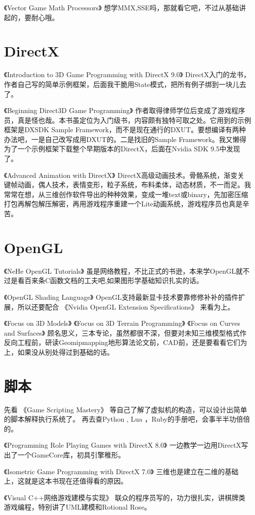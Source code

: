 \documentclass[UTF8,a4paper,8pt]{ctexart}
\begin{document}
《Vector Game Math Processors》
想学MMX,SSE吗，那就看它吧，不过从基础讲起的，要耐心哦。
\section{DirectX}
《Introduction to 3D Game Programming with DirectX 9.0》
DirectX入门的龙书，作者自己写的简单示例框架，后面我干脆用State模式，把所有例子绑到一块儿去了。

《Beginning Direct3D Game Programming》
作者取得律师学位后变成了游戏程序员，真是怪也哉。本书虽定位为入门级书，内容颇有独特可取之处。它用到的示例框架是DXSDK Sample Framework，而不是现在通行的DXUT。要想编译有两种办法吧，一是自己改写成用DXUT的。二是找旧的Sample Framework。我又懒得为了一个示例框架下载整个早期版本的DirectX，后面在Nvidia SDK 9.5中发现了。

《Advanced Animation with DirectX》
DirectX高级动画技术。骨骼系统，渐变关键帧动画，偶人技术，表情变形，粒子系统，布料柔体，动态材质，不一而足。我常常在想，从三维创作软件导出的种种效果，变成一堆text或binary，先加密压缩打包再解包解压解密，再用游戏程序重建一个Lite动画系统，游戏程序员也真是辛苦。
\section{OpenGL}
《NeHe OpenGL Tutorials》
虽是网络教程，不比正式的书逊，本来学OpenGL就不过是看百来条C函数文档的工夫吧,如果图形学基础知识扎实的话。

《OpenGL Shading Language》
OpenGL支持最新显卡技术要靠修修补补的插件扩展，所以还要配合
《Nvidia OpenGL Extension Specifications》
来看为上。

《Focus on 3D Models》
《Focus on 3D Terrain Programming》
《Focus on Curves and Surfaces》
顾名思义，三本专论，虽然都很不深，但要对未知三维模型格式作反向工程前，研读Geomipmapping地形算法论文前，CAD前，还是要看看它们为上，如果没从别处得过到基础的话。
\section{脚本}
先看
《Game Scripting Mastery》
等自己了解了虚拟机的构造，可以设计出简单的脚本解释执行系统了。
再去查Python , Lua ，Ruby的手册吧，会事半半功倍倍的。

《Programming Role Playing Games with DirectX 8.0》
一边教学一边用DirectX写出了一个GameCore库，初具引擎稚形。

《Isometric Game Programming with DirectX 7.0》
三维也是建立在二维的基础上，这就是这本书现在还值得看的原因。

《Visual C++网络游戏建模与实现》
联众的程序员写的，功力很扎实，讲棋牌类游戏编程，特别讲了UML建模和Rotional Rose。
\end{document}
